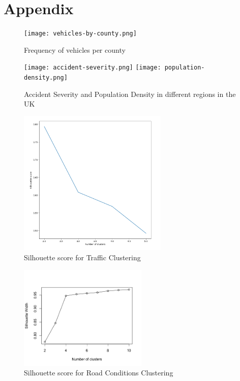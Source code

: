 \documentclass{neu_handout}
\begin{document}
 
\section{Appendix}
\begin{figure}[!htb]
  \texttt{[image: vehicles-by-county.png]}
  \caption{Frequency of vehicles per county}
\end{figure}


\begin{figure}[!htb]
  \texttt{[image: accident-severity.png]}
\endminipage\hfill
{}
  \texttt{[image: population-density.png]}
  \endminipage
\caption{Accident Severity and Population Density in different regions in the UK}  
\end{figure}

\begin{figure}[!htb]
    \begin{center}
      \includegraphics[height=7cm]{silhouette-score-traffic.png}
      \caption{Silhouette score for Traffic Clustering}
    \end{center}
\end{figure}

\begin{figure}[!htb]
    \begin{center}
      \includegraphics[height=5cm]{silhouette_road_conditions.png}
      \caption{Silhouette score for Road Conditions Clustering}
    \end{center}
\end{figure}
\end{document}
